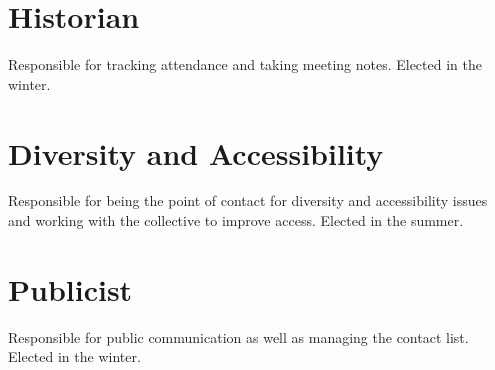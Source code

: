 \section{Historian}\label{sec:historian}
Responsible for tracking attendance and taking meeting notes. Elected in the winter.

\section{Diversity and Accessibility}\label{sec:accessability}
Responsible for being the point of contact for diversity and accessibility issues and working with the collective to improve access. Elected in the summer.

\section{Publicist}\label{sec:publicist}
Responsible for public communication as well as managing the contact list. Elected in the winter.
